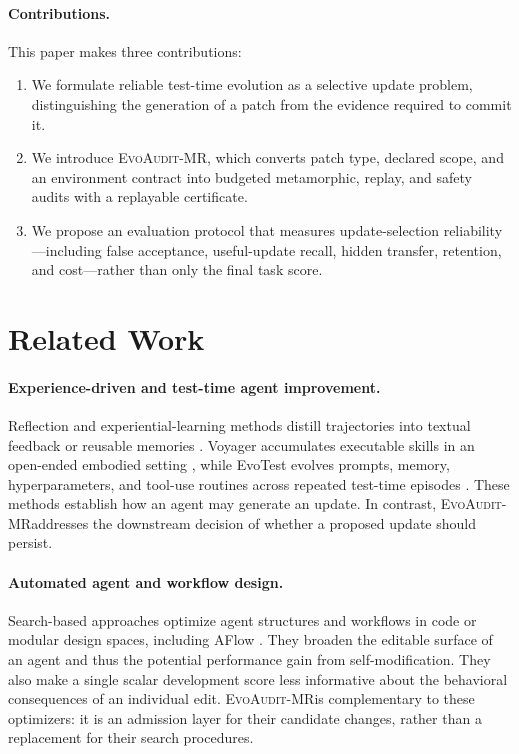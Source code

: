 \documentclass{article}
\newcommand{\method}{\textsc{EvoAudit-MR}}
\begin{document}
\paragraph{Contributions.} This paper makes three contributions:
\begin{enumerate}
    \item We formulate reliable test-time evolution as a selective update problem, distinguishing the generation of a patch from the evidence required to commit it.
    \item We introduce \method, which converts patch type, declared scope, and an environment contract into budgeted metamorphic, replay, and safety audits with a replayable certificate.
    \item We propose an evaluation protocol that measures update-selection reliability---including false acceptance, useful-update recall, hidden transfer, retention, and cost---rather than only the final task score.
\end{enumerate}

\section{Related Work}

\paragraph{Experience-driven and test-time agent improvement.}
Reflection and experiential-learning methods distill trajectories into textual feedback or reusable memories \citep{shinn2023reflexion,zhao2024expel}. Voyager accumulates executable skills in an open-ended embodied setting \citep{wang2023voyager}, while EvoTest evolves prompts, memory, hyperparameters, and tool-use routines across repeated test-time episodes \citep{he2026evotest}. These methods establish how an agent may generate an update. In contrast, \method addresses the downstream decision of whether a proposed update should persist.

\paragraph{Automated agent and workflow design.}
Search-based approaches optimize agent structures and workflows in code or modular design spaces, including AFlow \citep{zhang2025aflow}. They broaden the editable surface of an agent and thus the potential performance gain from self-modification. They also make a single scalar development score less informative about the behavioral consequences of an individual edit. \method is complementary to these optimizers: it is an admission layer for their candidate changes, rather than a replacement for their search procedures.
\end{document}
